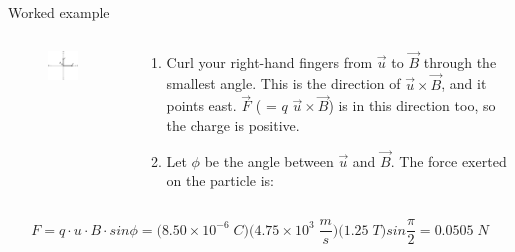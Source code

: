 {\begin{frame}{Worked example}
  \begin{columns}[T]
    \begin{column}{0.25\textwidth}
      \begin{center}
        \begin{figure}[ht]
            \includegraphics[width=0.90\textwidth]{./images/problems/lect05_FuB_directions}\\
        \end{figure}
      \end{center}
    \end{column}
    \begin{column}{0.75\textwidth}
      \begin{enumerate}
      \item
        Curl your right-hand fingers from $\vec{u}$ to $\vec{B}$ through the
        smallest angle. This is the direction of $\vec{u} \times \vec{B}$,
        and it points east. $\vec{F}$ ( = $q$ $\vec{u} \times \vec{B}$)
        is in this direction too, so the charge is positive.
      \item
        Let $\phi$ be the angle between $\vec{u}$ and $\vec{B}$.
        The force exerted on the particle is:
      \end{enumerate}
    \end{column}
  \end{columns}
  \begin{equation*}
    F
      = q \cdot u \cdot B \cdot sin\phi
      =  \Big( 8.50 \times 10^{-6} \; C\Big)
         \Big( 4.75 \times 10^{3} \; \frac{m}{s}\Big)
         \Big( 1.25\; T \Big) sin\frac{\pi}{2}
      = 0.0505 \; N
  \end{equation*}
\end{frame}

} %

